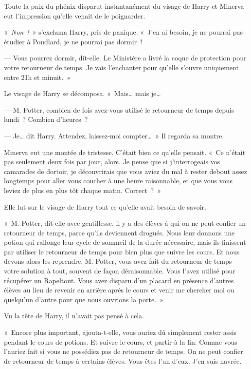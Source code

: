 Toute la paix du phénix disparut instantanément du visage de Harry et Minerva eut l'impression qu'elle venait de le poignarder.

«~\emph{Non~!}~» s'exclama Harry, pris de panique.
«~J'en ai besoin, je ne pourrai pas étudier à Poudlard, je ne pourrai pas dormir~!

--- Vous pourrez dormir, dit-elle.
Le Ministère a livré la coque de protection pour votre retourneur de temps.
Je vais l'enchanter pour qu'elle s'ouvre uniquement entre 21h et minuit.~»

Le visage de Harry se décomposa.
«~Mais… mais je…

--- M. Potter, combien de fois avez-vous utilisé le retourneur de temps depuis lundi~?
Combien d'heures~?

--- Je… dit Harry.
Attendez, laissez-moi compter…~»
Il regarda sa montre.

Minerva eut une montée de tristesse.
C'était bien ce qu'elle pensait.
«~Ce n'était pas seulement deux fois par jour, alors.
Je pense que si j'interrogeais vos camarades de dortoir, je découvrirais que vous aviez du mal à rester debout assez longtemps pour aller vous coucher à une heure raisonnable, et que vous vous leviez de plus en plus tôt chaque matin.
Correct~?~»

Elle lut sur le visage de Harry tout ce qu'elle avait besoin de savoir.

«~M. Potter, dit-elle avec gentillesse, il y a des élèves à qui on ne peut confier un retourneur de temps, parce qu'ils deviennent drogués.
Nous leur donnons une potion qui rallonge leur cycle de sommeil de la durée nécessaire, mais ils finissent par utiliser le retourneur de temps pour bien plus que suivre les cours.
Et nous devons alors les reprendre.
M. Potter, vous avez fait du retourneur de temps votre solution à tout, souvent de façon déraisonnable.
Vous l'avez utilisé pour récupérer un Rapeltout.
Vous avez disparu d'un placard en présence d'autres élèves au lieu de revenir en arrière après le cours et venir me chercher moi ou quelqu'un d'autre pour que nous ouvrions la porte.~»

Vu la tête de Harry, il n'avait pas pensé à cela.

«~Encore plus important, ajouta-t-elle, vous auriez dû simplement rester assis pendant le cours de potions.
Et suivre le cours, et partir à la fin.
Comme vous l'auriez fait si vous ne possédiez pas de retourneur de temps.
On ne peut confier de retourneur de temps à certains élèves.
Vous êtes l'un d'eux.
J'en suis navrée.

